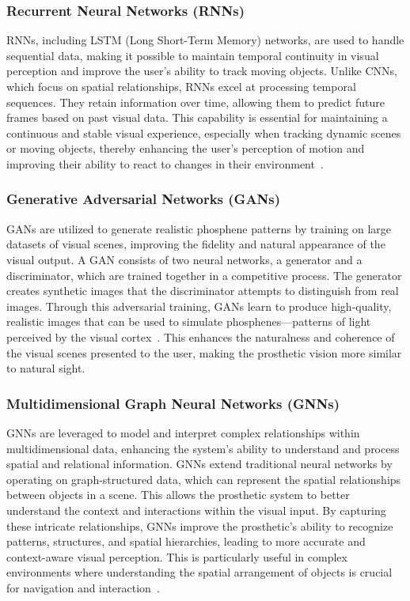 \documentclass[twocolumn,10pt]{article}
\begin{document}
\subsubsection*{Recurrent Neural Networks (RNNs)}
RNNs, including LSTM (Long Short-Term Memory) networks, are used to handle
sequential data, making it possible to maintain temporal continuity in visual
perception and improve the user's ability to track moving objects. Unlike CNNs,
which focus on spatial relationships, RNNs excel at processing temporal
sequences. They retain information over time, allowing them to predict future
frames based on past visual data. This capability is essential for maintaining a
continuous and stable visual experience, especially when tracking dynamic scenes
or moving objects, thereby enhancing the user's perception of motion and
improving their ability to react to changes in their
environment~\parencite{nayebiRecurrentConnectionsPrimate2022, liaoBridgingGapsResidual2016}.

\subsubsection*{Generative Adversarial Networks (GANs)}
GANs are utilized to generate realistic phosphene patterns by training on large
datasets of visual scenes, improving the fidelity and natural appearance of the
visual output. A GAN consists of two neural networks, a generator and a
discriminator, which are trained together in a competitive process. The
generator creates synthetic images that the discriminator attempts to
distinguish from real images. Through this adversarial training, GANs learn to
produce high-quality, realistic images that can be used to simulate
phosphenes—patterns of light perceived by the visual
cortex~\parencite{goodfellowGenerativeAdversarialNetworks2020,elnabawyPVGANGenerativeAdversarial2022}.
This enhances the naturalness and coherence of the visual scenes presented to
the user, making the prosthetic vision more similar to natural sight.

\subsubsection*{Multidimensional Graph Neural Networks (GNNs)}
GNNs are leveraged to model and interpret complex relationships within
multidimensional data, enhancing the system's ability to understand and process
spatial and relational information. GNNs extend traditional neural networks by
operating on graph-structured data, which can represent the spatial
relationships between objects in a scene. This allows the prosthetic system to
better understand the context and interactions within the visual input. By
capturing these intricate relationships, GNNs improve the prosthetic's ability
to recognize patterns, structures, and spatial hierarchies, leading to more
accurate and context-aware visual perception. This is particularly useful in
complex environments where understanding the spatial arrangement of objects is
crucial for navigation and
interaction~\parencite{subramanianGraphConvolutionalNetworks2020,wuComprehensiveSurveyGraph2021}.
\end{document}
